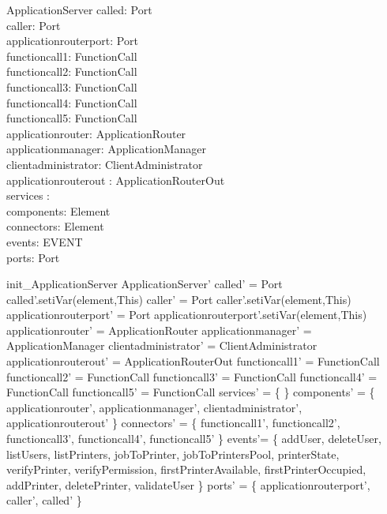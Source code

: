 \begin{schema}{ApplicationServer}
called: Port \\
caller: Port \\
applicationrouterport: Port \\
functioncall1: FunctionCall \\
functioncall2: FunctionCall \\
functioncall3: FunctionCall \\
functioncall4: FunctionCall \\
functioncall5: FunctionCall \\

applicationrouter: ApplicationRouter \\
applicationmanager:  ApplicationManager \\
clientadministrator: ClientAdministrator \\
applicationrouterout : ApplicationRouterOut \\

services : \nat \pfun \nat \\
components: \pset Element \\
connectors: \pset Element \\
events: \pset EVENT \\
ports: \pset Port
\end{schema}


\begin{zed}
init\_ApplicationServer \sdef \lsch ApplicationServer'
                        \bbar called' = \new Port
                        \land called'.setiVar(element,This)
                        \land caller' = \new Port
                        \land caller'.setiVar(element,This)
                        \land applicationrouterport' = \new Port
                        \land applicationrouterport'.setiVar(element,This)
                        \land applicationrouter' = \new ApplicationRouter
                        \land applicationmanager' = \new ApplicationManager
                        \land clientadministrator' = \new ClientAdministrator
                        \land applicationrouterout' = \new ApplicationRouterOut
                        \land functioncall1' = \new FunctionCall
                        \land functioncall2' = \new FunctionCall
                        \land functioncall3' = \new FunctionCall
                        \land functioncall4' = \new FunctionCall
                        \land functioncall5' = \new FunctionCall
                        \land services' = \{ \}
                        \land components' = \{ applicationrouter', applicationmanager', clientadministrator', applicationrouterout' \}
                        \land connectors' = \{ functioncall1', functioncall2', functioncall3', functioncall4', functioncall5' \}
                        \land events'= \{ addUser, deleteUser, listUsers, listPrinters, jobToPrinter, jobToPrintersPool, printerState, verifyPrinter, verifyPermission, firstPrinterAvailable, firstPrinterOccupied, addPrinter, deletePrinter, validateUser \}
                        \land ports' = \{ applicationrouterport', caller', called' \}  \rsch
                        \end{zed}

